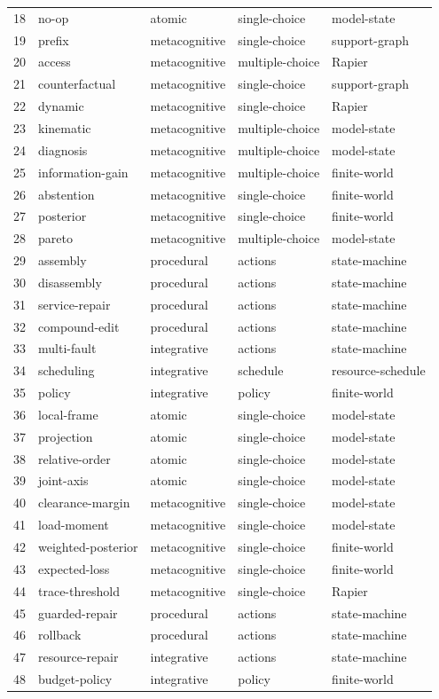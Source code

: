 \begin{center}
\begin{tabular}{rllll}
18 & no-op & atomic & single-choice & model-state \\
19 & prefix & metacognitive & single-choice & support-graph \\
20 & access & metacognitive & multiple-choice & Rapier \\
21 & counterfactual & metacognitive & single-choice & support-graph \\
22 & dynamic & metacognitive & single-choice & Rapier \\
23 & kinematic & metacognitive & multiple-choice & model-state \\
24 & diagnosis & metacognitive & multiple-choice & model-state \\
25 & information-gain & metacognitive & multiple-choice & finite-world \\
26 & abstention & metacognitive & single-choice & finite-world \\
27 & posterior & metacognitive & single-choice & finite-world \\
28 & pareto & metacognitive & multiple-choice & model-state \\
29 & assembly & procedural & actions & state-machine \\
30 & disassembly & procedural & actions & state-machine \\
31 & service-repair & procedural & actions & state-machine \\
32 & compound-edit & procedural & actions & state-machine \\
33 & multi-fault & integrative & actions & state-machine \\
34 & scheduling & integrative & schedule & resource-schedule \\
35 & policy & integrative & policy & finite-world \\
36 & local-frame & atomic & single-choice & model-state \\
37 & projection & atomic & single-choice & model-state \\
38 & relative-order & atomic & single-choice & model-state \\
39 & joint-axis & atomic & single-choice & model-state \\
40 & clearance-margin & metacognitive & single-choice & model-state \\
41 & load-moment & metacognitive & single-choice & model-state \\
42 & weighted-posterior & metacognitive & single-choice & finite-world \\
43 & expected-loss & metacognitive & single-choice & finite-world \\
44 & trace-threshold & metacognitive & single-choice & Rapier \\
45 & guarded-repair & procedural & actions & state-machine \\
46 & rollback & procedural & actions & state-machine \\
47 & resource-repair & integrative & actions & state-machine \\
48 & budget-policy & integrative & policy & finite-world \\
\bottomrule\end{tabular}\end{center}
\clearpage
